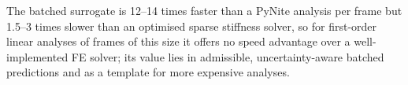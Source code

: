 The batched surrogate is 12--14 times faster than a PyNite analysis per frame but 1.5--3 times slower than an optimised sparse stiffness solver, so for first-order linear analyses of frames of this size it offers no speed advantage over a well-implemented FE solver; its value lies in admissible, uncertainty-aware batched predictions and as a template for more expensive analyses.
